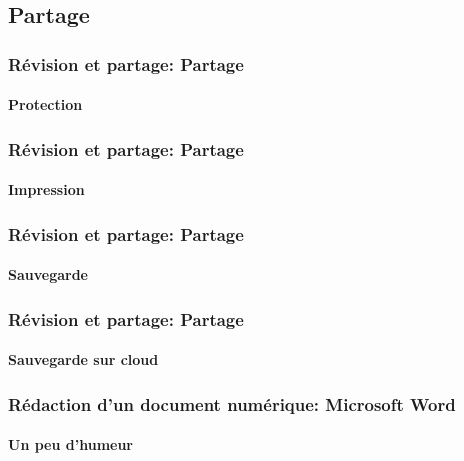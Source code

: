 \documentclass[xcolor=table]{beamer}
\begin{document}
\subsection{Partage}

%
%

\begin{frame}
\frametitle{Révision et partage: Partage}
\framesubtitle{Protection}

\end{frame}

\begin{frame}
\frametitle{Révision et partage: Partage}
\framesubtitle{Impression}

\end{frame}

\begin{frame}
\frametitle{Révision et partage: Partage}
\framesubtitle{Sauvegarde}

\end{frame}

\begin{frame}
\frametitle{Révision et partage: Partage}
\framesubtitle{Sauvegarde sur cloud}
\end{frame}

\begin{frame}
\frametitle{Rédaction d'un document numérique: Microsoft Word}
\framesubtitle{Un peu d'humeur}


\end{frame}


%
%	
%	
\end{document}
